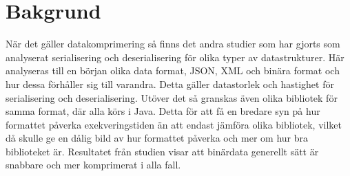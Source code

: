 \section{Bakgrund}
\label{sec:tim-background}
När det gäller datakomprimering så finns det andra studier som har gjorts som analyserat serialisering och deserialisering för olika typer av datastrukturer\cite{serialization}. Här analyseras till en början olika data format, JSON, XML och binära format och hur dessa förhåller sig till varandra. Detta gäller datastorlek och hastighet för serialisering och deserialisering. Utöver det så granskas även olika bibliotek för samma format, där alla körs i Java. Detta för att få en bredare syn på hur formattet påverka exekveringstiden än att endast jämföra olika bibliotek, vilket då skulle ge en dålig bild av hur formattet påverka och mer om hur bra biblioteket är. Resultatet från studien visar att binärdata generellt sätt är snabbare och mer komprimerat i alla fall.
